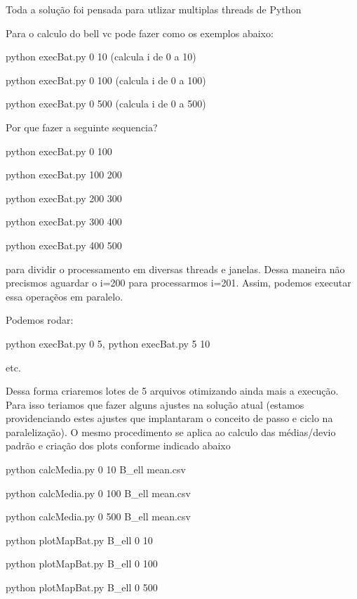 Toda a solução foi pensada para utlizar multiplas threads de Python

Para o calculo do bell vc pode fazer como os exemplos abaixo:

python execBat.py 0 10 (calcula i de 0 a 10)

python execBat.py 0 100 (calcula i de 0 a 100)

python execBat.py 0 500 (calcula i de 0 a 500)


Por que fazer a seguinte sequencia?

python execBat.py 0 100

python execBat.py 100 200

python execBat.py 200 300

python execBat.py 300 400

python execBat.py 400 500

para dividir o processamento em diversas threads e janelas. Dessa maneira não precismos aguardar o i=200 para processarmos i=201. Assim, podemos executar essa operaçẽos em paralelo. 

Podemos rodar:

python execBat.py 0 5, 
python execBat.py 5 10  

etc. 

Dessa forma criaremos lotes de 5 arquivos otimizando ainda mais a execução. 
Para isso teriamos que fazer alguns ajustes na solução atual (estamos providenciando estes ajustes que implantaram o conceito de passo e ciclo na paralelização). 
O mesmo procedimento se aplica ao calculo das médias/devio padrão e criação dos plots conforme indicado abaixo



python calcMedia.py 0 10 B_ell mean.csv

python calcMedia.py 0 100 B_ell mean.csv

python calcMedia.py 0 500 B_ell mean.csv



python plotMapBat.py B_ell 0 10

python plotMapBat.py B_ell 0 100

python plotMapBat.py B_ell 0 500